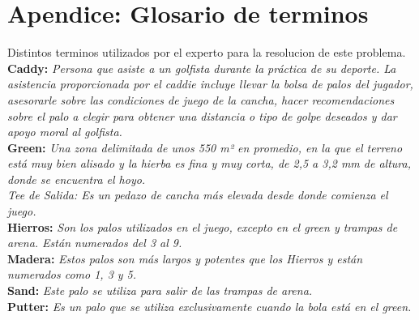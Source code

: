 \documentclass[runningheads,a4paper]{llncs}
\begin{document}
\section*{Apendice: Glosario de terminos}
Distintos terminos utilizados por el experto para la resolucion de este problema.\\
\textbf{Caddy:} \textit{Persona que asiste a un golfista durante la práctica de su deporte. La asistencia proporcionada por el caddie incluye llevar la bolsa de palos del jugador, asesorarle sobre las condiciones de juego de la cancha, hacer recomendaciones sobre el palo a elegir para obtener una distancia o tipo de golpe deseados y dar apoyo moral al golfista.}\\
\textbf{Green:}  \textit{Una zona delimitada de unos 550 m² en promedio, en la que el terreno está muy bien alisado y la hierba es fina y muy corta, de 2,5 a 3,2 mm de altura, donde se encuentra el hoyo.\\
Tee de Salida: Es un pedazo de cancha más elevada desde donde comienza el juego.}\\
\textbf{Hierros:} \textit{Son los palos utilizados en el juego, excepto en el green y trampas de arena. Están numerados del 3 al 9.}\\
\textbf{Madera:} \textit{Estos palos son más largos y potentes que los Hierros y están numerados como 1, 3 y 5.}\\
\textbf{Sand:} \textit{Este palo se utiliza para salir de las trampas de arena.}\\
\textbf{Putter:} \textit{Es un palo que se utiliza exclusivamente cuando la bola está en el green.}
\end{document}
